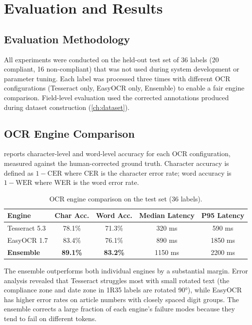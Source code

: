 \chapter{Evaluation and Results}
\label{ch:evaluation}

\section{Evaluation Methodology}

All experiments were conducted on the held-out test set of 36 labels (20 compliant, 16
non-compliant) that was not used during system development or parameter tuning. Each label
was processed three times with different OCR configurations (Tesseract only, EasyOCR only,
Ensemble) to enable a fair engine comparison. Field-level evaluation used the corrected
annotations produced during dataset construction (\cref{ch:dataset}).

\section{OCR Engine Comparison}

 reports character-level and word-level accuracy for each OCR
configuration, measured against the human-corrected ground truth. Character accuracy is
defined as $1 - \text{CER}$ where CER is the character error rate; word accuracy is
$1 - \text{WER}$ where WER is the word error rate.

\begin{table}[h]
\centering
\caption{OCR engine comparison on the test set (36 labels).}
\label{tab:ocr_comparison}
\begin{tabular}{lcccc}
\toprule
\textbf{Engine} & \textbf{Char Acc.} & \textbf{Word Acc.} & \textbf{Median Latency} & \textbf{P95 Latency} \\
\midrule
Tesseract 5.3   & 78.1\% & 71.3\% & 320 ms  & 590 ms \\
EasyOCR 1.7     & 83.4\% & 76.1\% & 890 ms  & 1850 ms \\
\textbf{Ensemble} & \textbf{89.1\%} & \textbf{83.2\%} & 1150 ms & 2200 ms \\
\bottomrule
\end{tabular}
\end{table}

The ensemble outperforms both individual engines by a substantial margin. Error analysis
revealed that Tesseract struggles most with small rotated text (the compliance zone and
date zone in 1R35 labels are rotated 90°), while EasyOCR has higher error rates on
article numbers with closely spaced digit groups. The ensemble corrects a large fraction of
each engine's failure modes because they tend to fail on different tokens.

